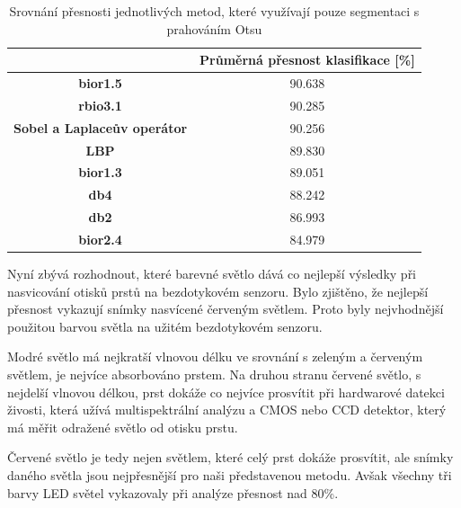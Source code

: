 \capstartfalse
\begin{table}[!htbp]
\centering
\begin{tabular}{|c|c|}
\hline
                                    & \textbf{Průměrná přesnost klasifikace {[}\%{]}} \\ \hline
\textbf{bior1.5}                        & 90.638                                         \\ \hline
\textbf{rbio3.1}                    & 90.285                                         \\ \hline
\textbf{Sobel a Laplaceův operátor}                    & 90.256                                         \\ \hline
\textbf{LBP} & 89.830                                         \\ \hline
\textbf{bior1.3}                    & 89.051                                         \\ \hline
\textbf{db4}                        & 88.242                                        \\ \hline
\textbf{db2}                        & 86.993                                         \\ \hline
\textbf{bior2.4}                    & 84.979                                         \\ \hline
\end{tabular}
\caption{Srovnání přesnosti jednotlivých metod, které využívají pouze segmentaci s prahováním Otsu}
\end{table}
\capstarttrue

Nyní zbývá rozhodnout, které barevné světlo dává co nejlepší výsledky při nasvicování otisků prstů na bezdotykovém senzoru. Bylo zjištěno, že nejlepší přesnost vykazují snímky nasvícené červeným světlem. Proto byly nejvhodnější použitou barvou světla na užitém bezdotykovém senzoru. 

Modré světlo má nejkratší vlnovou délku ve srovnání s zeleným a červeným světlem, je nejvíce absorbováno prstem. Na druhou stranu červené světlo, s nejdelší vlnovou délkou, prst dokáže co nejvíce prosvítit při hardwarové datekci živosti, která užívá multispektrální analýzu a CMOS nebo CCD detektor, který má měřit odražené světlo od otisku prstu. \cite{AdvancedBiometricsTechnologies2011}

Červené světlo je tedy nejen světlem, které celý prst dokáže prosvítit, ale snímky daného světla jsou nejpřesnější pro naši představenou metodu. Avšak všechny tři barvy LED světel vykazovaly při analýze přesnost nad 80\%.

